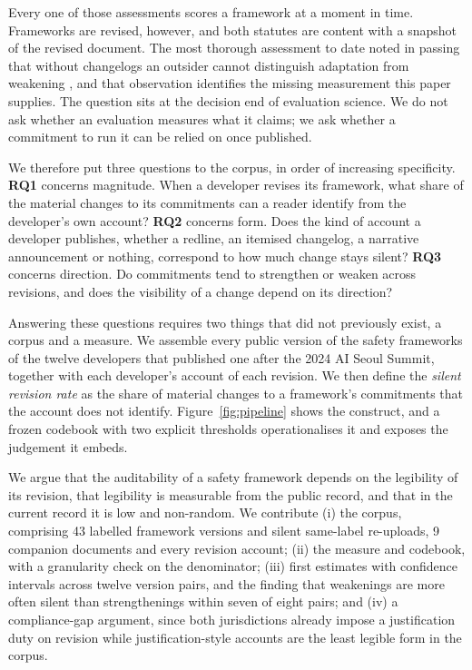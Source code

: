 \documentclass{article}
\begin{document}
Every one of those assessments scores a framework at a moment in time. Frameworks are revised, however, and both statutes are content with a snapshot of the revised document. The most thorough assessment to date noted in passing that without changelogs an outsider cannot distinguish adaptation from weakening \citep{stelling2025evaluating}, and that observation identifies the missing measurement this paper supplies. The question sits at the decision end of evaluation science. We do not ask whether an evaluation measures what it claims; we ask whether a commitment to run it can be relied on once published.

We therefore put three questions to the corpus, in order of increasing specificity. \textbf{RQ1} concerns magnitude. When a developer revises its framework, what share of the material changes to its commitments can a reader identify from the developer's own account? \textbf{RQ2} concerns form. Does the kind of account a developer publishes, whether a redline, an itemised changelog, a narrative announcement or nothing, correspond to how much change stays silent? \textbf{RQ3} concerns direction. Do commitments tend to strengthen or weaken across revisions, and does the visibility of a change depend on its direction?

Answering these questions requires two things that did not previously exist, a corpus and a measure. We assemble every public version of the safety frameworks of the twelve developers that published one after the 2024 AI Seoul Summit, together with each developer's account of each revision. We then define the \emph{silent revision rate} as the share of material changes to a framework's commitments that the account does not identify. Figure~\ref{fig:pipeline} shows the construct, and a frozen codebook with two explicit thresholds operationalises it and exposes the judgement it embeds.

We argue that the auditability of a safety framework depends on the legibility of its revision, that legibility is measurable from the public record, and that in the current record it is low and non-random. We contribute (i) the corpus, comprising 43 labelled framework versions and silent same-label re-uploads, 9 companion documents and every revision account; (ii) the measure and codebook, with a granularity check on the denominator; (iii) first estimates with confidence intervals across twelve version pairs, and the finding that weakenings are more often silent than strengthenings within seven of eight pairs; and (iv) a compliance-gap argument, since both jurisdictions already impose a justification duty on revision while justification-style accounts are the least legible form in the corpus.
\end{document}
